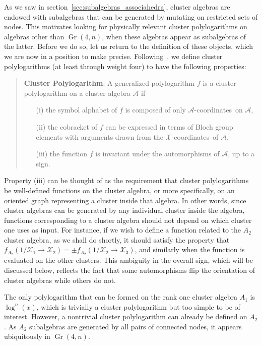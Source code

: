 \documentclass[11pt]{article}
\DeclareMathOperator{\Gr}{Gr}
\def\x{\mathcal{X}}
\def\xcoords{$\mathcal{X}$-coordinates}
\def\a{\mathcal{A}}
\def\acoords{$\mathcal{A}$-coordinates}
\begin{document}
As we saw in section~\ref{sec:subalgebras_associahedra}, cluster algebras are endowed with subalgebras that can be generated by mutating on restricted sets of nodes. This motivates looking for physically relevant cluster polylogarithms on algebras other than $\Gr(4,n)$, when these algebras appear as subalgebras of the latter. Before we do so, let us return to the definition of these objects, which we are now in a position to make precise. Following~\cite{Golden:2014xqa}, we define cluster polylogarithms (at least through weight four) to have the following properties:
\begin{quote}
{\bf Cluster Polylogarithm}: A generalized polylogarithm $f$ is a cluster polylogarithm on a cluster algebra $\a$ if
\vspace{-.2cm}
 \begin{itemize}
 \item[(i)] the symbol alphabet of $f$ is composed of only \acoords\ on $\a$, 
 \item[(ii)] the cobracket of $f$ can be expressed in terms of Bloch group elements with arguments drawn from the \xcoords\ of $\a$,
 \item[(iii)] the function $f$ is invariant under the automorphisms of $\a$, up to a sign.
 \end{itemize}
\end{quote}
Property (iii) can be thought of as the requirement that cluster polylogarithms be well-defined functions on the cluster algebra, or more specifically, on an oriented graph representing a cluster inside that algebra. In other words, since cluster algebras can be generated by any individual cluster inside the algebra, functions corresponding to a cluster algebra should not depend on which cluster one uses as input. For instance, if we wish to define a function related to the $A_2$ cluster algebra, as we shall do shortly, it should satisfy the property that $f_{A_2}(1/\x_1\to\x_2)=\pm f_{A_2}(1/\x_2\to\x_3)$, and similarly when the function is evaluated on the other clusters. This ambiguity in the overall sign, which will be discussed below, reflects the fact that some automorphisms flip the orientation of cluster algebras while others do not.

The only polylogarithm that can be formed on the rank one cluster algebra $A_1$ is $\log^n(x)$, which is trivially a cluster polylogarithm but too simple to be of interest. However, a nontrivial cluster polylogarithm can already be defined on $A_2$. As $A_2$ subalgebras are generated by all pairs of connected nodes, it appears ubiquitously in $\Gr(4,n)$. 
\end{document}
